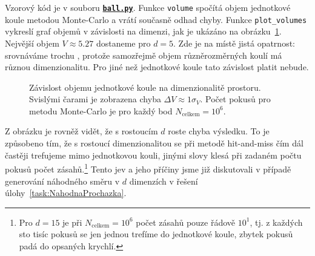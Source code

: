 \documentclass[a4paper,11pt,twoside]{article}
\def\code#1{\textnormal{\texttt{#1}}}
\def\ghfile#1#2{\textnormal{\textbf{\texttt{\href{https://github.com/PavelStransky/PCInPhysics/blob/main/#1#2}{#2}}}}}
\theoremstyle{red}
\theoremstyle{green}
\begin{document}
            \begin{solution}
                Vzorový kód je v souboru \ghfile{python/montecarlo/}{ball.py}.
                Funkce \code{volume} spočítá objem jednotkové koule metodou Monte-Carlo a vrátí současně odhad chyby.
                Funkce \code{plot_volumes} vykreslí graf objemů v závislosti na dimenzi, jak je ukázáno na obrázku~\ref{fig:VolumeBall}.
                Nejvější objem $V\approx5.27$ dostaneme pro $d=5$.
                Zde je na místě jistá opatrnost: srovnáváme trochu , protože samozřejmě objem různěrozměrných koulí má různou dimenzionalitu.
                Pro jiné než jednotkové koule tato závislost platit nebude.

                \begin{figure}[!htbp]
                    \centering{}
                    \caption{
                        \protect\small
                        Závislost objemu jednotkové koule na dimenzionalitě prostoru.
                        Svislými čarami je zobrazena chyba $\Delta V\approx1\sigma_{V}$.
                        Počet pokusů pro metodu Monte-Carlo je pro každý bod $N_{\text{celkem}}=10^{6}$.
                    }
                    \label{fig:VolumeBall}
                \end{figure}
    
                Z obrázku je rovněž vidět, že s rostoucím $d$ roste chyba výsledku.
                To je způsobeno tím, že s rostoucí dimenzionalitou se při metodě hit-and-miss čím dál častěji trefujeme mimo jednotkovou kouli, jinými slovy klesá při zadaném počtu pokusů počet zásahů.\footnote{
                    Pro $d=15$ je při $N_{\text{celkem}}=10^6$ počet zásahů pouze řádově $10^1$, tj. z každých sto tisíc pokusů se jen jednou trefíme do jednotkové koule, zbytek pokusů padá do  opsaných krychlí.
                }
                Tento jev a jeho příčiny jsme již diskutovali v případě generování náhodného směru v $d$ dimenzích v řešení úlohy~\ref{task:NahodnaProchazka}.
            \end{solution}
\end{document}
